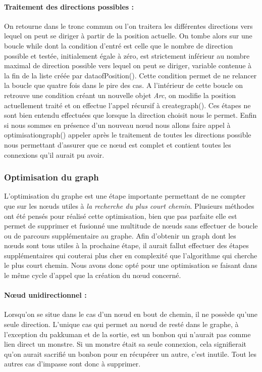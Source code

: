 \documentclass[12pt, oneside]{article}
\begin{document}
\paragraph{Traitement des directions possibles :}
On retourne dans le tronc commun ou l’on traitera les différentes directions vers lequel on peut se diriger à partir de la position actuelle. On tombe alors sur une boucle while dont la condition d’entré est celle que le nombre de direction possible et testée, initialement égale à zéro, est strictement inférieur au nombre maximal de direction possible vers lequel on peut se diriger, variable contenue à la fin de la liste créée par data\textunderscore ofPosition(). Cette condition permet de ne relancer la boucle que quatre fois dans le pire des cas. 
A l’intérieur de cette boucle on retrouve une condition créant un nouvelle objet \emph{Arc}, on modifie la position actuellement traité et on effectue l’appel récursif à create\textunderscore graph(). Ces étapes ne sont bien entendu effectuées que lorsque la direction choisit nous le permet. 
Enfin si nous sommes en présence d’un nouveau nœud nous allons faire appel à optimisation\textunderscore graph()  appeler après le traitement de toutes les directions possible nous permettant d’assurer que ce nœud est complet et contient toutes les connexions qu’il aurait pu avoir.

\subsubsection{Optimisation du graph}
L’optimisation du graphe est une étape importante permettant de ne compter que sur les nœuds utiles à \emph{la recherche du plus court chemin}. Plusieurs méthodes ont été pensés pour réalisé cette optimisation, bien que pas parfaite elle est permet de supprimer et fusionné une multitude de nœuds sans effectuer de boucle ou de parcours supplémentaire au graphe. Afin d’obtenir un graph dont les nœuds sont tous utiles à la prochaine étape, il aurait fallut effectuer des étapes supplémentaires qui couterai plus cher en complexité que l’algorithme qui cherche le plus court chemin. 
Nous avons donc opté pour une optimisation se faisant dans le même cycle d’appel que la création du nœud concerné. 

\paragraph{Nœud unidirectionnel :}
Lorsqu’on se situe dans le cas d’un nœud en bout de chemin, il ne possède qu’une seule direction. L’unique cas qui permet au nœud de resté dans le graphe, à l’exception du pakkuman et de la sortie, est un bonbon qui n’aurait pas comme lien direct un monstre. Si un monstre était sa seule connexion, cela signifierait qu’on aurait sacrifié un bonbon pour en récupérer un autre, c’est inutile. Tout les autres cas d’impasse sont donc à supprimer.
\end{document}
